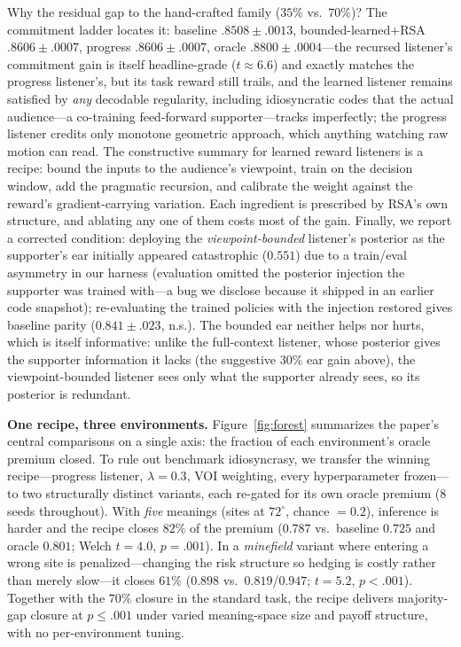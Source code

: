 \documentclass{article}
\begin{document}
Why the residual gap to the hand-crafted family ($35\%$ vs.\ $70\%$)? The commitment ladder locates it: baseline $.8508\pm.0013$, bounded-learned$+$RSA $.8606\pm.0007$, progress $.8606\pm.0007$, oracle $.8800\pm.0004$---the recursed listener's commitment gain is itself headline-grade ($t\approx6.6$) and exactly matches the progress listener's, but its task reward still trails, and the learned listener remains satisfied by \emph{any} decodable regularity, including idiosyncratic codes that the actual audience---a co-training feed-forward supporter---tracks imperfectly; the progress listener credits only monotone geometric approach, which anything watching raw motion can read. The constructive summary for learned reward listeners is a recipe: bound the inputs to the audience's viewpoint, train on the decision window, add the pragmatic recursion, and calibrate the weight against the reward's gradient-carrying variation. Each ingredient is prescribed by RSA's own structure, and ablating any one of them costs most of the gain. Finally, we report a corrected condition: deploying the \emph{viewpoint-bounded} listener's posterior as the supporter's ear initially appeared catastrophic ($0.551$) due to a train/eval asymmetry in our harness (evaluation omitted the posterior injection the supporter was trained with---a bug we disclose because it shipped in an earlier code snapshot); re-evaluating the trained policies with the injection restored gives baseline parity ($0.841\pm.023$, n.s.). The bounded ear neither helps nor hurts, which is itself informative: unlike the full-context listener, whose posterior gives the supporter information it lacks (the suggestive $30\%$ ear gain above), the viewpoint-bounded listener sees only what the supporter already sees, so its posterior is redundant.

\textbf{One recipe, three environments.} Figure~\ref{fig:forest} summarizes the paper's central comparisons on a single axis: the fraction of each environment's oracle premium closed. To rule out benchmark idiosyncrasy, we transfer the winning recipe---progress listener, $\lambda=0.3$, VOI weighting, every hyperparameter frozen---to two structurally distinct variants, each re-gated for its own oracle premium (8 seeds throughout). With \emph{five} meanings (sites at $72^\circ$, chance $=0.2$), inference is harder and the recipe closes $82\%$ of the premium ($0.787$ vs.\ baseline $0.725$ and oracle $0.801$; Welch $t=4.0$, $p=.001$). In a \emph{minefield} variant where entering a wrong site is penalized---changing the risk structure so hedging is costly rather than merely slow---it closes $61\%$ ($0.898$ vs.\ $0.819$/$0.947$; $t=5.2$, $p<.001$). Together with the $70\%$ closure in the standard task, the recipe delivers majority-gap closure at $p{\le}.001$ under varied meaning-space size and payoff structure, with no per-environment tuning.
\end{document}
